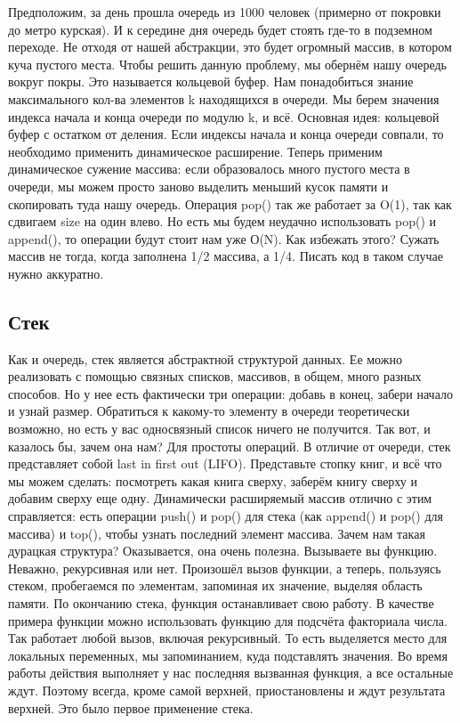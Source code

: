 \documentclass[12pt]{article}
\begin{document}
Предположим, за день прошла очередь из 1000 человек (примерно от покровки до метро курская). И к середине дня очередь будет стоять где-то в подземном переходе. Не отходя от нашей абстракции, это будет огромный массив, в котором куча пустого места. Чтобы решить данную проблему, мы обернём нашу очередь вокруг покры. Это называется кольцевой буфер. Нам понадобиться знание максимального кол-ва элементов k находящихся в очереди. Мы берем значения индекса начала и конца очереди по модулю k, и всё. Основная идея: кольцевой буфер с остатком от деления. Если индексы начала и конца очереди совпали, то необходимо применить динамическое расширение. Теперь применим динамическое сужение массива: если образовалось много пустого места в очереди, мы можем просто заново выделить меньший кусок памяти и скопировать туда нашу очередь. Операция pop() так же работает за O(1), так как сдвигаем size на один влево. Но есть мы будем неудачно использовать pop() и append(), то операции будут стоит нам уже О(N). Как избежать этого? Сужать массив не тогда, когда заполнена 1/2 массива, а 1/4. Писать код в таком случае нужно аккуратно.

\subsection*{Стек}
Как и очередь, стек является абстрактной структурой данных. Ее можно реализовать с помощью связных списков, массивов, в общем, много разных способов. Но у нее есть фактически три операции: добавь в конец, забери начало и узнай размер. Обратиться к какому-то элементу в очереди теоретически возможно, но есть у вас односвязный список ничего не получится. Так вот, и казалось бы, зачем она нам? Для простоты операций. В отличие от очереди, стек представляет собой last in first out (LIFO). Представьте стопку книг, и всё что мы можем сделать: посмотреть какая книга сверху, заберём книгу сверху и добавим сверху еще одну. Динамически расширяемый массив отлично с этим справляется: есть операции push() и pop() для стека (как append() и pop() для массива) и top(), чтобы узнать последний элемент массива. Зачем нам такая дурацкая структура? Оказывается, она очень полезна. Вызываете вы функцию. Неважно, рекурсивная или нет. Произошёл вызов функции, а теперь, пользуясь стеком, пробегаемся по элементам, запоминая их значение, выделяя область памяти. По окончанию стека, функция останавливает свою работу. В качестве примера функции можно использовать функцию для подсчёта факториала числа. Так работает любой вызов, включая рекурсивный. То есть выделяется место для локальных переменных, мы запоминанием, куда подставлять значения. Во время работы действия выполняет у нас последняя вызванная функция, а все остальные ждут. Поэтому всегда, кроме самой верхней, приостановлены и ждут результата верхней. Это было первое применение стека.
\end{document}
